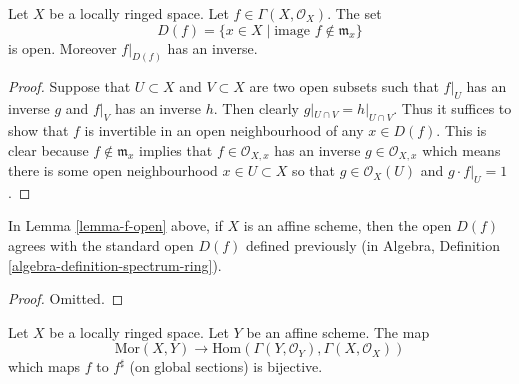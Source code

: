 \begin{lemma}
\label{lemma-f-open}
Let $X$ be a locally ringed space.
Let $f \in \Gamma(X, \mathcal{O}_X)$.
The set
$$
D(f) = \{x \in X \mid \text{image }f \not\in \mathfrak m_x\}
$$
is open. Moreover $f|_{D(f)}$ has an inverse.
\end{lemma}

\begin{proof}
Suppose that $U \subset X$ and $V \subset X$ are
two open subsets such that $f|_U$ has an inverse
$g$ and $f|_V$ has an inverse $h$. Then clearly
$g|_{U\cap V} = h|_{U\cap V}$. Thus it suffices
to show that $f$ is invertible in an open neighbourhood
of any $x \in D(f)$. This is clear because
$f \not \in \mathfrak m_x$ implies that $f \in \mathcal{O}_{X,x}$
has an inverse $g \in \mathcal{O}_{X,x}$ which means there
is some open neighbourhood $x \in U \subset X$ so
that $g \in \mathcal{O}_X(U)$ and $g\cdot f|_U = 1$.
\end{proof}

\begin{lemma}
\label{lemma-f-open-affine}
In Lemma \ref{lemma-f-open} above, if $X$ is an affine scheme,
then the open $D(f)$ agrees with the standard open $D(f)$
defined previously (in
Algebra, Definition \ref{algebra-definition-spectrum-ring}).
\end{lemma}

\begin{proof}
Omitted.
\end{proof}

\begin{lemma}
\label{lemma-morphism-into-affine}
Let $X$ be a locally ringed space.
Let $Y$ be an affine scheme.
The map
$$
\text{Mor}(X, Y)
\longrightarrow
\text{Hom}(\Gamma(Y, \mathcal{O}_Y), \Gamma(X, \mathcal{O}_X))
$$
which maps $f$ to $f^\sharp$ (on global sections) is bijective.
\end{lemma}

